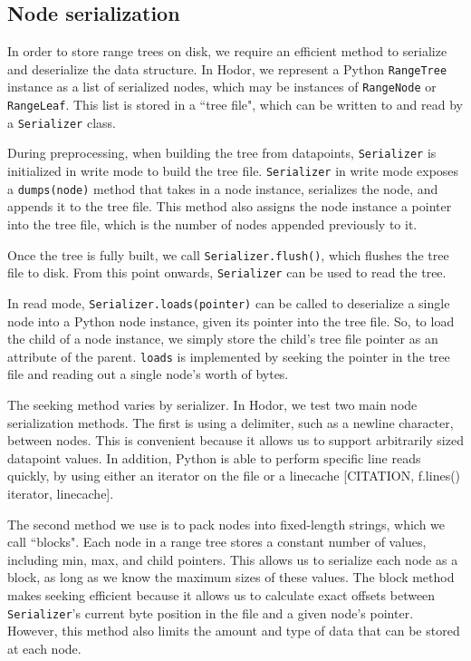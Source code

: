 \documentclass[11pt, oneside]{article}
\begin{document}
\subsection{Node serialization}

In order to store range trees on disk, we require an efficient method to
serialize and deserialize the data structure. In Hodor, we represent a Python
\texttt{RangeTree} instance as a list of serialized nodes, which may be
instances of \texttt{RangeNode} or \texttt{RangeLeaf}. This list is stored in a
``tree file", which can be written to and read by a \texttt{Serializer} class. 

During preprocessing, when building the tree from datapoints,
\texttt{Serializer} is initialized in write mode to build the tree file.
\texttt{Serializer} in write mode exposes a \texttt{dumps(node)} method that
takes in a node instance, serializes the node, and appends it to the tree file.
This method also assigns the node instance a pointer into the tree file, which
is the number of nodes appended previously to it. 

Once the tree is fully built, we call \texttt{Serializer.flush()}, which
flushes the tree file to disk. From this point onwards, \texttt{Serializer} can
be used to read the tree.

In read mode, \texttt{Serializer.loads(pointer)} can be called to deserialize a
single node into a Python node instance, given its pointer into the tree file.
So, to load the child of a node instance, we simply store the child's tree file
pointer as an attribute of the parent. \texttt{loads} is implemented by seeking
the pointer in the tree file and reading out a single node's worth of bytes.

The seeking method varies by serializer. In Hodor, we test two main node
serialization methods. The first is using a delimiter, such as a newline
character, between nodes. This is convenient because it allows us to support
arbitrarily sized datapoint values. In addition, Python is able to perform
specific line reads quickly, by using either an iterator on the file or a
linecache [CITATION, f.lines() iterator, linecache]. 

The second method we use is to pack nodes into fixed-length strings, which we
call ``blocks". Each node in a range tree stores a constant number of values,
including min, max, and child pointers. This allows us to serialize each node
as a block, as long as we know the maximum sizes of these values. The block
method makes seeking efficient because it allows us to calculate exact offsets
between \texttt{Serializer}'s current byte position in the file and a given
node's pointer. However, this method also limits the amount and type of data
that can be stored at each node. 
\end{document}
